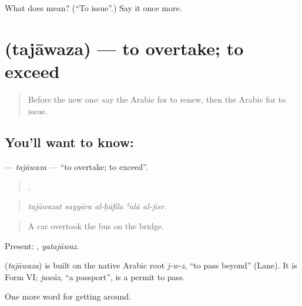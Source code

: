 \begin{tcolorbox}[breakable,colback=teal!4,colframe=teal!35!black,title={Before you move on}]
What does  mean? (\textquotedblleft{}To issue\textquotedblright{}.) Say it once more.
\end{tcolorbox}
\section[\texorpdfstring{\ar{تجاوز} (tajāwaza)}{تجاوز (tajāwaza)}]{ (tajāwaza) — to overtake; to exceed}

\label{lesson:AR-C434-tajawaza}



\begin{quote}
Before the new one: say the Arabic for to renew, then the Arabic for to issue.
\end{quote}

\subsection*{You'll want to know: }
\textbf{} — \emph{tajāwaza} — \textquotedblleft{}to overtake; to exceed\textquotedblright{}.

\begin{quote}
    .
\end{quote}

\begin{quote}
\emph{tajāwazat sayyāra al-ḥāfila ʿalā al-jisr.}
\end{quote}

\begin{quote}
A car overtook the bus on the bridge.
\end{quote}

Present: , \emph{yatajāwaz}.

\begin{cousinweb}
\textbf{} (\emph{tajāwaza}) is built on the native Arabic root \emph{j-w-z}, \textquotedblleft{}to pass beyond\textquotedblright{} (Lane). It is Form VI; \emph{jawāz}, \textquotedblleft{}a passport\textquotedblright{}, is a permit to pass.
\end{cousinweb}

\begin{grammarlens}[title={What you've built}]
One more word for getting around.
\end{grammarlens}

